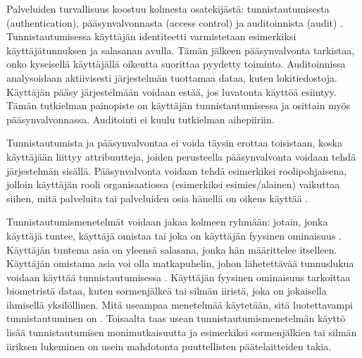 Palveluiden turvallisuus koostuu kolmesta osatekijästä: tunnistautumisesta (authentication), pääsynvalvonnasta (access control) ja auditoinnista (audit) \cite{sandhu}. Tunnistautumisessa käyttäjän identiteetti varmistetaan esimerkiksi käyttäjätunnuksen ja salasanan avulla. Tämän jälkeen pääsynvalvonta tarkistaa, onko kyseisellä käyttäjällä oikeutta suorittaa pyydetty toiminto. Auditoinnissa analysoidaan aktiivisesti järjestelmän tuottamaa dataa, kuten lokitiedostoja. Käyttäjän pääsy järjestelmään voidaan estää, jos luvatonta käyttöä esiintyy. Tämän tutkielman pai\-no\-pis\-te on käyttäjän tunnistautumisessa ja osittain myös pääsynvalvonnassa. Auditointi ei kuulu tutkielman aihepiiriin.

Tunnistautumista ja pääsynvalvontaa ei voida täysin erottaa toisistaan, koska käyttäjään liittyy attribuutteja, joiden perusteella pääsynvalvonta voidaan tehdä järjestelmän sisällä. Pääsynvalvonta voidaan tehdä esimerkiksi roolipohjaisena, jolloin käyttäjän rooli organisaatiossa (esimerkiksi esimies/alainen) vaikuttaa siihen, mitä palveluita tai palveluiden osia hänellä on oikeus käyttää \cite{sandhu_rbac}.

Tunnistautumismenetelmät voidaan jakaa kolmeen ryhmään: jotain, jonka käyttäjä tuntee, käyttäjä omistaa tai joka on käyttäjän fyysinen ominaisuus \cite{nisti}. Käyttäjän tuntema asia on yleensä salasana, jonka hän määrittelee itselleen. Käyttäjän omistama asia voi olla matkapuhelin, johon lähetettävää tunnuslukua voidaan käyttää tunnistautumisessa \cite{5336918}. Käyttäjän fyysinen ominaisuus tarkoittaa biometristä dataa, kuten sormenjälkeä tai silmän iiristä, joka on jokaisella ihmisellä yksilöllinen. Mitä useampaa menetelmää käytetään, sitä luotettavampi tunnistautuminen on \cite{nisti}. Toisaalta taas usean tunnistautumismenetelmän käyttö lisää tunnistautumisen monimutkaisuutta ja esimerkiksi sormenjälkien tai silmän iiriksen lukeminen on usein mahdotonta puuttellisten päätelaitteiden takia.